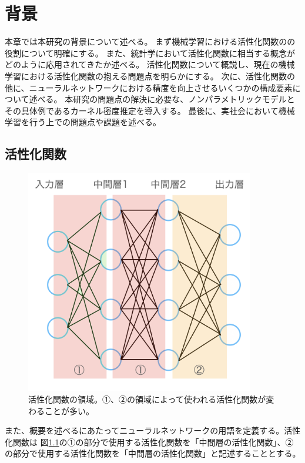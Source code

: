 \chapter{背景}
\label{background}

本章では本研究の背景について述べる。
まず機械学習における活性化関数のの役割について明確にする。
また、統計学において活性化関数に相当する概念がどのように応用されてきたか述べる。
活性化関数について概説し、現在の機械学習における活性化関数の抱える問題点を明らかにする。
次に、活性化関数の他に、ニューラルネットワークにおける精度を向上させるいくつかの構成要素について述べる。
本研究の問題点の解決に必要な、ノンパラメトリックモデルとその具体例であるカーネル密度推定を導入する。
最後に、実社会において機械学習を行う上での問題点や課題を述べる。



\section{活性化関数}

\begin{figure}[hbtp]
    \begin{center}
        \includegraphics[width=10cm]{asset/neural_network2.png}
            \caption{活性化関数の領域。①、②の領域によって使われる活性化関数が変わることが多い。}
            \label{neural_network1}
    \end{center}
\end{figure}

また、概要を述べるにあたってニューラルネットワークの用語を定義する。活性化関数は
図\ref{neural_network1}の①の部分で使用する活性化関数を「中間層の活性化関数」、②の部分で使用する活性化関数を「中間層の活性化関数」と記述することとする。

